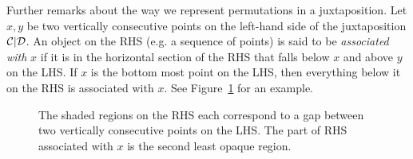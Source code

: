 \documentclass[12pt, a4paper, twoside]{report}
\begin{document}
Further remarks about the way we represent permutations in a juxtaposition. Let $x,y$ be two vertically consecutive points on the left-hand side of the juxtaposition $\mathcal{C}|\mathcal{D}$. An object on the RHS (e.g. a sequence of points) is said to be \emph{associated with} $x$ if it is in the horizontal section of the RHS that falls below $x$ and above $y$ on the LHS. If $x$ is the bottom most point on the LHS, then everything below it on the RHS is associated with $x$. See Figure~\ref{fig:xregion} for an example.
\begin{figure}[ht]
  \centering
  \caption{The shaded regions on the RHS each correspond to a gap between two vertically consecutive points on the LHS. The part of RHS associated with $x$ is the second least opaque region.}
  \label{fig:xregion}
\end{figure}

\end{document}
